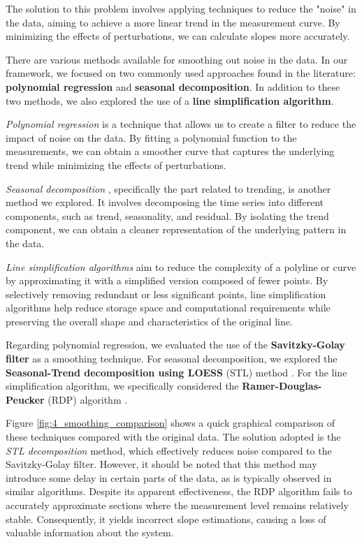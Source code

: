 \bigskip
The solution to this problem involves applying techniques to reduce the "noise" in the data, aiming to achieve a more linear trend in the measurement curve. By minimizing the effects of perturbations, we can calculate slopes more accurately.

There are various methods available for smoothing out noise in the data. In our framework, we focused on two commonly used approaches found in the literature: \textbf{polynomial regression} and \textbf{seasonal decomposition}. In addition to these two methods, we also explored the use of a \textbf{line simplification algorithm}.

\bigskip
\textit{Polynomial regression} \cite{polynomial_regression} is a technique that allows us to create a filter to reduce the impact of noise on the data. By fitting a polynomial function to the measurements, we can obtain a smoother curve that captures the underlying trend while minimizing the effects of perturbations.

\textit{Seasonal decomposition} \cite{seasonal_decomposition}, specifically the part related to trending, is another method we explored. It involves decomposing the time series into different components, such as trend, seasonality, and residual. By isolating the trend component, we can obtain a cleaner representation of the underlying pattern in the data.

\textit{Line simplification algorithms} \cite{line_simplification_algo} aim to reduce the complexity of a polyline or curve by approximating it with a simplified version composed of fewer points. By selectively removing redundant or less significant points, line simplification algorithms help reduce storage space and computational requirements while preserving the overall shape and characteristics of the original line.

\bigskip
Regarding polynomial regression, we evaluated the use of the \textbf{Savitzky-Golay filter} \cite{savgol} as a smoothing technique. For seasonal decomposition, we explored the \textbf{Seasonal-Trend decomposition using LOESS} (STL) method \cite{stl_decomp}. For the line simplification algorithm, we specifically considered the \textbf{Ramer-Douglas-Peucker} (RDP) algorithm \cite{ramer-douglas-peucker}.

\bigskip
Figure \ref{fig:4_smoothing_comparison} shows a quick graphical comparison of these techniques compared with the original data. The solution adopted is the \textit{STL decomposition} method, which effectively reduces noise compared to the Savitzky-Golay filter. However, it should be noted that this method may introduce some delay in certain parts of the data, as is typically observed in similar algorithms. Despite its apparent effectiveness, the RDP algorithm fails to accurately approximate sections where the measurement level remains relatively stable. Consequently, it yields incorrect slope estimations, causing a loss of valuable information about the system.

